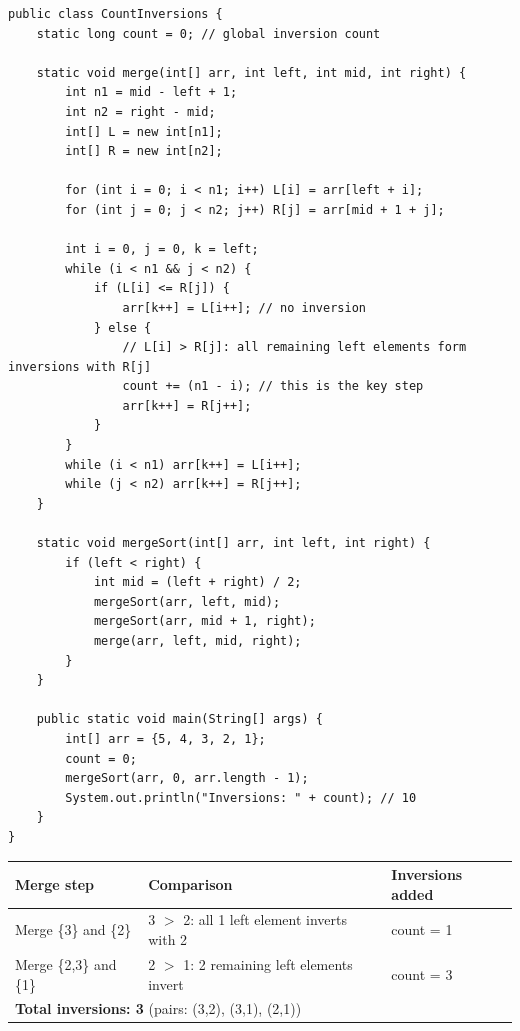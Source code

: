 \documentclass[12pt,a4paper,oneside]{book}
\begin{document}
\begin{lstlisting}[caption={Count Inversions --- Modified Merge Sort, O(n log n) time O(n) space}]
public class CountInversions {
    static long count = 0; // global inversion count

    static void merge(int[] arr, int left, int mid, int right) {
        int n1 = mid - left + 1;
        int n2 = right - mid;
        int[] L = new int[n1];
        int[] R = new int[n2];

        for (int i = 0; i < n1; i++) L[i] = arr[left + i];
        for (int j = 0; j < n2; j++) R[j] = arr[mid + 1 + j];

        int i = 0, j = 0, k = left;
        while (i < n1 && j < n2) {
            if (L[i] <= R[j]) {
                arr[k++] = L[i++]; // no inversion
            } else {
                // L[i] > R[j]: all remaining left elements form inversions with R[j]
                count += (n1 - i); // this is the key step
                arr[k++] = R[j++];
            }
        }
        while (i < n1) arr[k++] = L[i++];
        while (j < n2) arr[k++] = R[j++];
    }

    static void mergeSort(int[] arr, int left, int right) {
        if (left < right) {
            int mid = (left + right) / 2;
            mergeSort(arr, left, mid);
            mergeSort(arr, mid + 1, right);
            merge(arr, left, mid, right);
        }
    }

    public static void main(String[] args) {
        int[] arr = {5, 4, 3, 2, 1};
        count = 0;
        mergeSort(arr, 0, arr.length - 1);
        System.out.println("Inversions: " + count); // 10
    }
}
\end{lstlisting}

\begin{dryrun}[arr = \{3, 2, 1\}]
\begin{center}
\begin{tabular}{lll}
\toprule
\textbf{Merge step} & \textbf{Comparison} & \textbf{Inversions added}\\
\midrule
Merge \{3\} and \{2\}     & 3 $>$ 2: all 1 left element inverts with 2 & count = 1\\
Merge \{2,3\} and \{1\}   & 2 $>$ 1: 2 remaining left elements invert  & count = 3\\
\midrule
\multicolumn{3}{l}{\textbf{Total inversions: 3} \quad (pairs: (3,2), (3,1), (2,1))}\\
\bottomrule
\end{tabular}
\end{center}
\end{dryrun}
\end{document}

